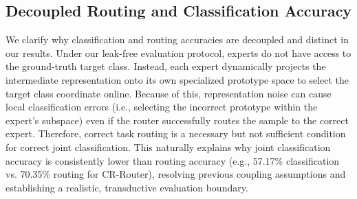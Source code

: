\documentclass{article}
\theoremstyle{plain}
\theoremstyle{definition}
\theoremstyle{remark}
\begin{document}
\subsection{Decoupled Routing and Classification Accuracy}
We clarify why classification and routing accuracies are decoupled and distinct in our results. Under our leak-free evaluation protocol, experts do not have access to the ground-truth target class. Instead, each expert dynamically projects the intermediate representation onto its own specialized prototype space to select the target class coordinate online. Because of this, representation noise can cause local classification errors (i.e., selecting the incorrect prototype within the expert's subspace) even if the router successfully routes the sample to the correct expert. Therefore, correct task routing is a necessary but not sufficient condition for correct joint classification. This naturally explains why joint classification accuracy is consistently lower than routing accuracy (e.g., 57.17\% classification vs. 70.35\% routing for CR-Router), resolving previous coupling assumptions and establishing a realistic, transductive evaluation boundary.
\end{document}
